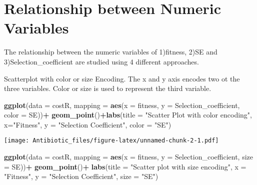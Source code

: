 \documentclass[
]{article}
\newenvironment{Shaded}{\begin{snugshade}}{\end{snugshade}}
\newcommand{\AttributeTok}[1]{\textcolor[rgb]{0.13,0.29,0.53}{#1}}
\newcommand{\FunctionTok}[1]{\textcolor[rgb]{0.13,0.29,0.53}{\textbf{#1}}}
\newcommand{\NormalTok}[1]{#1}
\newcommand{\SpecialCharTok}[1]{\textcolor[rgb]{0.81,0.36,0.00}{\textbf{#1}}}
\newcommand{\StringTok}[1]{\textcolor[rgb]{0.31,0.60,0.02}{#1}}
\begin{document}
\section{Relationship between Numeric
Variables}\label{relationship-between-numeric-variables}

The relationship between the numeric variables of 1)fitness, 2)SE and
3)Selection\_coefficient are studied using 4 different approaches.

Scatterplot with color or size Encoding. The x and y axis encodes two ot
the three variables. Color or size is used to represent the third
variable.

\begin{Shaded}
\begin{Highlighting}[]
\FunctionTok{ggplot}\NormalTok{(}\AttributeTok{data =}\NormalTok{ costR, }\AttributeTok{mapping =} \FunctionTok{aes}\NormalTok{(}\AttributeTok{x =}\NormalTok{ fitness, }\AttributeTok{y =}\NormalTok{ Selection\_coefficient, }\AttributeTok{color =}\NormalTok{ SE))}\SpecialCharTok{+}
  \FunctionTok{geom\_point}\NormalTok{()}\SpecialCharTok{+}\FunctionTok{labs}\NormalTok{(}\AttributeTok{title =} \StringTok{"Scatter Plot with color encoding"}\NormalTok{,}
                    \AttributeTok{x=}\StringTok{"Fitness"}\NormalTok{,}
                    \AttributeTok{y =} \StringTok{"Selection Coefficient"}\NormalTok{,}
                    \AttributeTok{color =} \StringTok{"SE"}\NormalTok{)}
\end{Highlighting}
\end{Shaded}

\texttt{[image: Antibiotic\_files/figure-latex/unnamed-chunk-2-1.pdf]}

\begin{Shaded}
\begin{Highlighting}[]
\FunctionTok{ggplot}\NormalTok{(}\AttributeTok{data =}\NormalTok{ costR, }\AttributeTok{mapping =} \FunctionTok{aes}\NormalTok{(}\AttributeTok{x =}\NormalTok{ fitness, }\AttributeTok{y =}\NormalTok{ Selection\_coefficient, }\AttributeTok{size =}\NormalTok{ SE))}\SpecialCharTok{+}
  \FunctionTok{geom\_point}\NormalTok{()}\SpecialCharTok{+}
  \FunctionTok{labs}\NormalTok{(}\AttributeTok{title =} \StringTok{"Scatter plot with size encoding"}\NormalTok{,}
       \AttributeTok{x =} \StringTok{"Fitness"}\NormalTok{,}
       \AttributeTok{y =} \StringTok{"Selection Coefficient"}\NormalTok{,}
       \AttributeTok{size =} \StringTok{"SE"}\NormalTok{)}
\end{Highlighting}
\end{Shaded}
\end{document}
